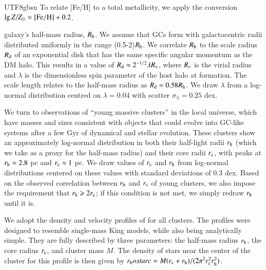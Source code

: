 \documentclass[trackchanges, twocolappendix, twocolumn]{aastex701}
\begin{document}
\begin{CJK*}{UTF8}{gbsn}
To relate [Fe/H] to a total metallicity, we apply the conversion $\lg Z/Z_\odot \approx \rm [Fe/H] + 0.2$.

galaxy's half-mass radius, $R_{\rm h}$. We assume that GCs form with galactocentric radii distributed uniformly in the range (0.5-2)$R_{\rm h}$. We correlate $R_{\rm h}$ to the scale radius $R_{\rm d}$ of an exponential disk that has the same specific angular momentum as the DM halo. This results in a value of $R_{\rm d} \approx 2^{-1/2} \lambda R_{\rm v}$, where $R_{\rm v}$ is the virial radius and $\lambda$ is the dimensionless spin parameter of the host halo at formation. The scale length relates to the half-mass radius as $R_{\rm d} = 0.58 R_{\rm h}$. We draw $\lambda$ from a log-normal distribution centred on $\lambda = 0.04$ with scatter $\sigma_{\lambda} = 0.25$ dex. 

We turn to observations of ``young massive clusters'' in the local universe, which have masses and sizes consistent with objects that could evolve into GC-like systems after a few Gyr of dynamical and stellar evolution. These clusters show an approximately log-normal distribution in both their half-light radii $r_{\rm h}$ (which we take as a proxy for the half-mass radius) and their core radii $r_{\rm c}$, with peaks at $r_{\rm h} \approx 2.8$ pc and $r_{\rm c} \approx 1$ pc. We draw values of $r_{\rm c}$ and $r_{\rm h}$ from log-normal distributions centered on these values with standard deviations of 0.3 dex. Based on the observed correlation between $r_{\rm h}$ and $r_{\rm c}$ of young clusters, we also impose the requirement that $r_{\rm h} \geqslant 2r_{\rm c}$; if this condition is not met, we simply redraw $r_{\rm h}$ until it is.

We adopt the density and velocity profiles of \cite{stone_ostriker_2015} for all clusters. The profiles were designed to resemble single-mass King models, while also being analytically simple. They are fully described by three parameters: the half-mass radius $r_{\rm h}$, the core radius $r_{\rm c}$, and cluster mass $M$. The density of stars near the center of the cluster for this profile is then given by $r_{\rm h}ostarc = M(r_{\rm c} + r_{\rm h})/(2\pi^2r_{\rm c}^2r_{\rm h}^2)$.


\end{CJK*}
\end{document}
